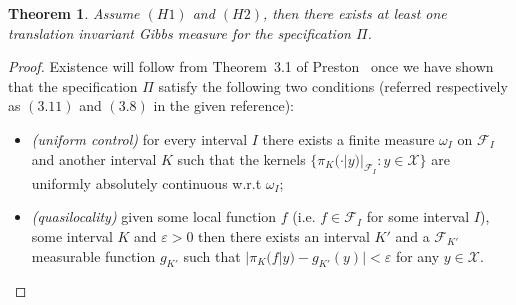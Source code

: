 \documentclass[a4paper,12pt,reqno]{amsart}
\newtheorem{theorem}{Theorem}
\newcommand{\eps}{\varepsilon}
\newcommand{\X}{\mathcal{X}}
\newcommand{\F}{\mathcal{F}}
\begin{document}
\begin{theorem}
\label{th:existence}
Assume $(H1)$ and $(H2)$, then there exists at least one translation invariant Gibbs measure
for the specification $\Pi$.  
\end{theorem}
\begin{proof}
Existence will follow from Theorem~3.1 of Preston~\cite{Preston} once we have shown that the specification $\Pi$ satisfy the following two conditions (referred respectively as $(3.11)$ and $(3.8)$ in the given reference):
\begin{itemize}
\item[a)] \textit{(uniform control)} for every interval $I$ there exists a finite measure $\omega_I$  on $\F_I$ and another interval $K$ such that the kernels $\{\pi_K(\cdot|y)|_{\F_I} : y \in \X\}$ are uniformly absolutely continuous w.r.t $\omega_I$;
\item[b)] \textit{(quasilocality)} given some local function $f$ (i.e. $f \in \F_I$ for some interval $I$), some interval $K$ and $\eps > 0$ then there exists an interval $K'$ and a $\F_{K'}$ measurable function $g_{K'}$ such that $|\pi_K(f|y)-g_{K'}(y)| < \eps$ for any $y \in \X$.
\end{itemize}


\end{proof}
\end{document}
